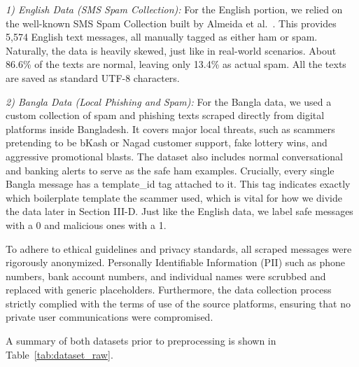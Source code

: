 \documentclass[journal]{IEEEtran}
\begin{document}
\textit{1) English Data (SMS Spam Collection):} For the English portion, we relied on the well-known SMS Spam Collection built by Almeida et al.~\cite{ref1}. This provides 5,574 English text messages, all manually tagged as either ham or spam. Naturally, the data is heavily skewed, just like in real-world scenarios. About 86.6\% of the texts are normal, leaving only 13.4\% as actual spam. All the texts are saved as standard UTF-8 characters.

\textit{2) Bangla Data (Local Phishing and Spam):} For the Bangla data, we used a custom collection of spam and phishing texts scraped directly from digital platforms inside Bangladesh. It covers major local threats, such as scammers pretending to be bKash or Nagad customer support, fake lottery wins, and aggressive promotional blasts. The dataset also includes normal conversational and banking alerts to serve as the safe ham examples. Crucially, every single Bangla message has a template\_id tag attached to it. This tag indicates exactly which boilerplate template the scammer used, which is vital for how we divide the data later in Section III-D. Just like the English data, we label safe messages with a 0 and malicious ones with a 1.

To adhere to ethical guidelines and privacy standards, all scraped messages were rigorously anonymized. Personally Identifiable Information (PII) such as phone numbers, bank account numbers, and individual names were scrubbed and replaced with generic placeholders. Furthermore, the data collection process strictly complied with the terms of use of the source platforms, ensuring that no private user communications were compromised.

A summary of both datasets prior to preprocessing is shown in Table~\ref{tab:dataset_raw}.

\begin{table}[htbp]
\caption{Dataset Composition Before Preprocessing}
\label{tab:dataset_raw}
\centering
{}
\end{table}
\end{document}
